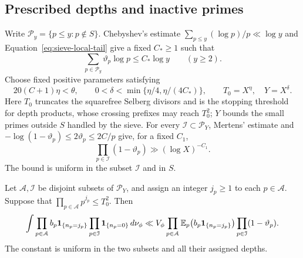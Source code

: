 \subsection{Prescribed depths and inactive primes}

Write
$\mathcal P_y=\{p\le y:p\notin S\}$.  Chebyshev's estimate
$\sum_{p\le y}(\log p)/p\ll\log y$ and
Equation~\eqref{eq:sieve-local-tail} give a fixed $C_*\ge1$ such that
\[
 \sum_{p\in\mathcal P_y}\vartheta_p\log p\le C_*\log y
 \qquad(y\ge2).
\]
Choose fixed positive parameters satisfying
\begin{equation}\label{eq:sieve-parameters}
 20(C+1)\eta<\theta,\qquad
 0<\delta<\min\{\eta/4,\eta/(4C_*)\},
 \qquad T_0=X^\eta,\quad Y=X^\delta.
\end{equation}
Here $T_0$ truncates the squarefree Selberg divisors and is the stopping
threshold for depth products, whose crossing prefixes may reach $T_0^2$;
$Y$ bounds the small primes outside $S$ handled by the sieve.
For every $\mathcal I\subset\mathcal P_Y$, Mertens' estimate and
$-\log(1-\vartheta_p)\le2\vartheta_p\le2C/p$ give, for a fixed $C_1$,
\begin{equation}\label{eq:sieve-inactivity-lower}
 \prod_{p\in\mathcal I}(1-\vartheta_p)
       \gg(\log X)^{-C_1}.
\end{equation}
The bound is uniform in the subset $\mathcal I$ and in $S$.

\begin{lemma}\label{lem:sieve-assignment}
Let $\mathcal A,\mathcal I$ be disjoint subsets of $\mathcal P_Y$, and
assign an integer $j_p\ge1$ to each $p\in\mathcal A$.  Suppose that
$\prod_{p\in\mathcal A}p^{j_p}\le T_0^2$.  Then
\begin{equation}\label{eq:sieve-assignment}
 \int
   \prod_{p\in\mathcal A}
      b_p\mathbf 1_{\{n_p=j_p\}}
   \prod_{p\in\mathcal I}\mathbf 1_{\{n_p=0\}}\,
        d\nu_\phi
 \ll V_\phi
   \prod_{p\in\mathcal A}\mathbb E_p
      \bigl(b_p\mathbf 1_{\{n_p=j_p\}}\bigr)
   \prod_{p\in\mathcal I}(1-\vartheta_p).
\end{equation}
The constant is uniform in the two subsets and all their assigned depths.
\end{lemma}

